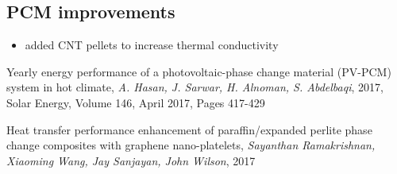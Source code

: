 \documentclass{scrartcl}[12pt, halfparskip]
\begin{document}
\subsection{PCM improvements}
\begin{itemize}
	\item added CNT pellets to increase thermal conductivity \cite{cnt_pellets}
\end{itemize}



\newpage
\begin{thebibliography}{9}

  
  Yearly energy performance of a photovoltaic-phase change material
  (PV-PCM) system in hot climate, 
  \textit{A. Hasan, J. Sarwar, H. Alnoman, S. Abdelbaqi},
  2017,
  Solar Energy, Volume 146, April 2017, Pages 417-429

   Heat transfer performance enhancement of paraffin/expanded
   perlite phase change composites with graphene nano-platelets,
   \textit{Sayanthan Ramakrishnan, Xiaoming Wang, Jay Sanjayan, John Wilson},
   2017
  
  
\end{thebibliography}
\end{document}
